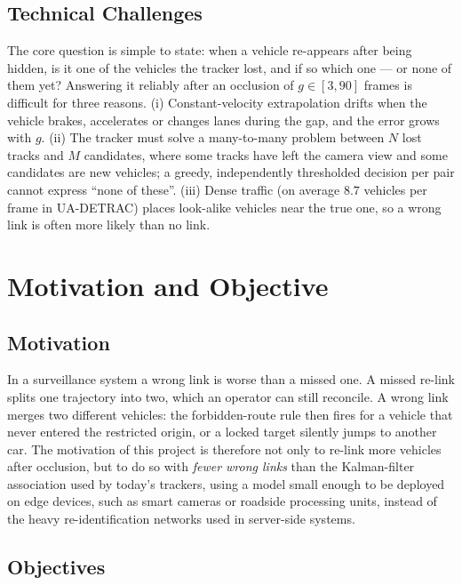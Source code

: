 \subsection{Technical Challenges}
\label{sec:bg_challenges}

The core question is simple to state: when a vehicle re-appears after being hidden, is it one of the vehicles the tracker lost, and if so which one --- or none of them yet? Answering it reliably after an occlusion of $g \in [3, 90]$ frames is difficult for three reasons. (i) Constant-velocity extrapolation drifts when the vehicle brakes, accelerates or changes lanes during the gap, and the error grows with $g$. (ii) The tracker must solve a many-to-many problem between $N$ lost tracks and $M$ candidates, where some tracks have left the camera view and some candidates are new vehicles; a greedy, independently thresholded decision per pair cannot express ``none of these''. (iii) Dense traffic (on average $8.7$ vehicles per frame in UA-DETRAC) places look-alike vehicles near the true one, so a wrong link is often more likely than no link.

\section{Motivation and Objective}
\label{sec:motivation_objective}

\subsection{Motivation}
\label{sec:motivation}

In a surveillance system a wrong link is worse than a missed one. A missed re-link splits one trajectory into two, which an operator can still reconcile. A wrong link merges two different vehicles: the forbidden-route rule then fires for a vehicle that never entered the restricted origin, or a locked target silently jumps to another car. The motivation of this project is therefore not only to re-link more vehicles after occlusion, but to do so with \emph{fewer wrong links} than the Kalman-filter association used by today's trackers, using a model small enough to be deployed on edge devices, such as smart cameras or roadside processing units, instead of the heavy re-identification networks used in server-side systems.

\subsection{Objectives}
\label{sec:objectives}

